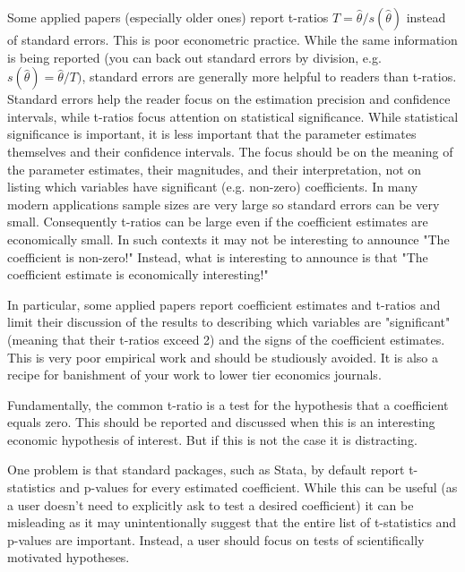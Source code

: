 \documentclass[10pt]{article}
\begin{document}
Some applied papers (especially older ones) report t-ratios $T=\widehat{\theta} / s(\widehat{\theta})$ instead of standard errors. This is poor econometric practice. While the same information is being reported (you can back out standard errors by division, e.g. $s(\widehat{\theta})=\widehat{\theta} / T)$, standard errors are generally more helpful to readers than t-ratios. Standard errors help the reader focus on the estimation precision and confidence intervals, while t-ratios focus attention on statistical significance. While statistical significance is important, it is less important that the parameter estimates themselves and their confidence intervals. The focus should be on the meaning of the parameter estimates, their magnitudes, and their interpretation, not on listing which variables have significant (e.g. non-zero) coefficients. In many modern applications sample sizes are very large so standard errors can be very small. Consequently t-ratios can be large even if the coefficient estimates are economically small. In such contexts it may not be interesting to announce "The coefficient is non-zero!" Instead, what is interesting to announce is that "The coefficient estimate is economically interesting!"

In particular, some applied papers report coefficient estimates and t-ratios and limit their discussion of the results to describing which variables are "significant" (meaning that their t-ratios exceed 2) and the signs of the coefficient estimates. This is very poor empirical work and should be studiously avoided. It is also a recipe for banishment of your work to lower tier economics journals.

Fundamentally, the common t-ratio is a test for the hypothesis that a coefficient equals zero. This should be reported and discussed when this is an interesting economic hypothesis of interest. But if this is not the case it is distracting.

One problem is that standard packages, such as Stata, by default report t-statistics and p-values for every estimated coefficient. While this can be useful (as a user doesn't need to explicitly ask to test a desired coefficient) it can be misleading as it may unintentionally suggest that the entire list of t-statistics and p-values are important. Instead, a user should focus on tests of scientifically motivated hypotheses.
\end{document}

